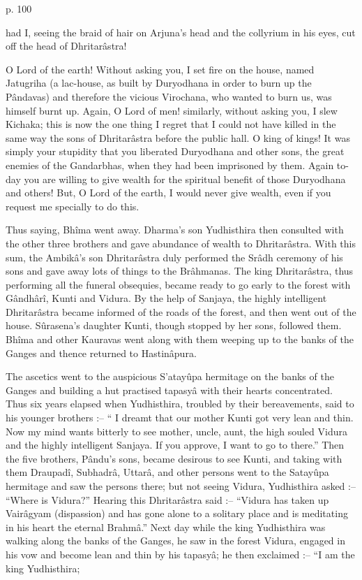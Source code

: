  

p. 100

 

had I, seeing the braid of hair on Arjuna's head and the collyrium in his eyes, cut off the head of Dhritarâstra!

 

O Lord of the earth! Without asking you, I set fire on the house, named Jatugriha (a lac-house, as built by Duryodhana in order to burn up the Pândavas) and therefore the vicious Virochana, who wanted to burn us, was himself burnt up. Again, O Lord of men! similarly, without asking you, I slew Kichaka; this is now the one thing I regret that I could not have killed in the same way the sons of Dhritarâstra before the public hall. O king of kings! It was simply your stupidity that you liberated Duryodhana and other sons, the great enemies of the Gandarbhas, when they had been imprisoned by them. Again to-day you are willing to give wealth for the spiritual benefit of those Duryodhana and others! But, O Lord of the earth, I would never give wealth, even if you request me specially to do this.

 

Thus saying, Bhîma went away. Dharma's son Yudhisthira then consulted with the other three brothers and gave abundance of wealth to Dhritarâstra. With this sum, the Ambikâ's son Dhritarâstra duly performed the Srâdh ceremony of his sons and gave away lots of things to the Brâhmanas. The king Dhritarâstra, thus performing all the funeral obsequies, became ready to go early to the forest with Gândhârî, Kunti and Vidura. By the help of Sanjaya, the highly intelligent Dhritarâstra became informed of the roads of the forest, and then went out of the house. Sûrasena's daughter Kunti, though stopped by her sons, followed them. Bhîma and other Kauravas went along with them weeping up to the banks of the Ganges and thence returned to Hastinâpura.

 

The ascetics went to the auspicious S’atayûpa hermitage on the banks of the Ganges and building a hut practised tapasyâ with their hearts concentrated. Thus six years elapsed when Yudhisthira, troubled by their bereavements, said to his younger brothers :-- “ I dreamt that our mother Kunti got very lean and thin. Now my mind wants bitterly to see mother, uncle, aunt, the high souled Vidura and the highly intelligent Sanjaya. If you approve, I want to go to there.” Then the five brothers, Pându's sons, became desirous to see Kunti, and taking with them Draupadî, Subhadrâ, Uttarâ, and other persons went to the Satayûpa hermitage and saw the persons there; but not seeing Vidura, Yudhisthira asked :-- “Where is Vidura?” Hearing this Dhritarâstra said :-- “Vidura has taken up Vairâgyam (dispassion) and has gone alone to a solitary place and is meditating in his heart the eternal Brahmâ.” Next day while the king Yudhisthira was walking along the banks of the Ganges, he saw in the forest Vidura, engaged in his vow and become lean and thin by his tapasyâ; he then exclaimed :-- “I am the king Yudhisthira;

